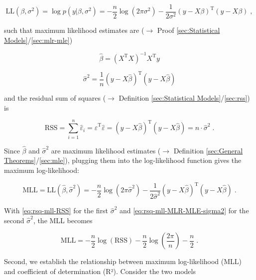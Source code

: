 \documentclass[a4paper,12pt,twoside]{book}
\begin{document}
\begin{equation} \label{eq:rsq-mll-MLR-LL}
\mathrm{LL}(\beta,\sigma^2) = \log p(y|\beta,\sigma^2) = - \frac{n}{2} \log(2\pi\sigma^2) - \frac{1}{2\sigma^2} (y - X\beta)^\mathrm{T} (y - X\beta) \; ,
\end{equation}

such that maximum likelihood estimates are ($\rightarrow$ Proof \ref{sec:Statistical Models}/\ref{sec:mlr-mle})

\begin{equation} \label{eq:rsq-mll-MLR-MLE-beta}
\hat{\beta} = (X^\mathrm{T} X)^{-1} X^\mathrm{T} y
\end{equation}

\begin{equation} \label{eq:rsq-mll-MLR-MLE-sigma2}
\hat{\sigma}^2 = \frac{1}{n} (y - X\hat{\beta})^\mathrm{T} (y - X\hat{\beta})
\end{equation}

and the residual sum of squares ($\rightarrow$ Definition \ref{sec:Statistical Models}/\ref{sec:rss}) is

\begin{equation} \label{eq:rsq-mll-RSS}
\mathrm{RSS} = \sum_{i=1}^n \hat{\varepsilon}_i = \hat{\varepsilon}^\mathrm{T} \hat{\varepsilon} = (y - X\hat{\beta})^\mathrm{T} (y - X\hat{\beta}) = n \cdot \hat{\sigma}^2 \; .
\end{equation}

Since $\hat{\beta}$ and $\hat{\sigma}^2$ are maximum likelihood estimates ($\rightarrow$ Definition \ref{sec:General Theorems}/\ref{sec:mle}), plugging them into the log-likelihood function gives the maximum log-likelihood:

\begin{equation} \label{eq:rsq-mll-MLR-MLL}
\mathrm{MLL} = \mathrm{LL}(\hat{\beta},\hat{\sigma}^2) = - \frac{n}{2} \log(2\pi\hat{\sigma}^2) - \frac{1}{2\hat{\sigma}^2} (y - X\hat{\beta})^\mathrm{T} (y - X\hat{\beta}) \; .
\end{equation}

With \eqref{eq:rsq-mll-RSS} for the first $\hat{\sigma}^2$ and \eqref{eq:rsq-mll-MLR-MLE-sigma2} for the second $\hat{\sigma}^2$, the MLL becomes

\begin{equation} \label{eq:rsq-mll-MLR-MLL-RSS}
\mathrm{MLL} = - \frac{n}{2} \log(\mathrm{RSS}) - \frac{n}{2} \log \left( \frac{2\pi}{n} \right) - \frac{n}{2} \; .
\end{equation}

Second, we establish the relationship between maximum log-likelihood (MLL) and coefficient of determination (R²). Consider the two models
\end{document}
